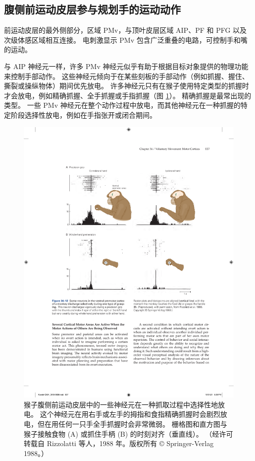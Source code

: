 \subsection{腹侧前运动皮层参与规划手的运动动作}
前运动皮层的最外侧部分，区域 PMv，与顶叶皮层区域 AIP、PF 和 PFG 以及次级体感区域相互连接。 电刺激显示 PMv 包含广泛重叠的电路，可控制手和嘴的运动。

与 AIP 神经元一样，许多 PMv 神经元似乎有助于根据目标对象提供的物理功能来控制手部动作。 
这些神经元倾向于在某些刻板的手部动作（例如抓握、握住、撕裂或操纵物体）期间优先放电。 
许多神经元只有在猴子使用特定类型的抓握时才会放电，例如精确抓握、全手抓握或手指抓握（图 \ref{fig:34_12}）。 
精确抓握是最常出现的类型。 一些 PMv 神经元在整个动作过程中放电，而其他神经元在一种抓握的特定阶段选择性放电，例如在手指张开或闭合期间。

\begin{figure}[htbp]
	\centering
	\includegraphics[width=0.8\linewidth]{chap34/fig_34_12}
	\caption{猴子腹侧前运动皮层中的一些神经元在一种抓取过程中选择性地放电。 这个神经元在用右手或左手的拇指和食指精确抓握时会剧烈放电，但在用任何一只手全手抓握时会非常微弱。 栅格图和直方图与猴子接触食物 (A) 或抓住手柄 (B) 的时刻对齐（垂直线）。 （经许可转载自 Rizzolatti 等人，1988 年。版权所有 © Springer-Verlag 1988。）}
	\label{fig:34_12}
\end{figure}


